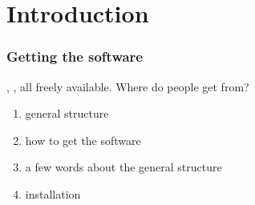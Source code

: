 

\chapter{Introduction}
\label{INTRO}

\subsection{Getting the software}


\escript, \ESyS, all freely available.  Where do people get \finley from?



\begin{enumerate}
 \item general structure 
 \item how to get the software
 \item a few words about the general structure
\item installation
\end{enumerate}


